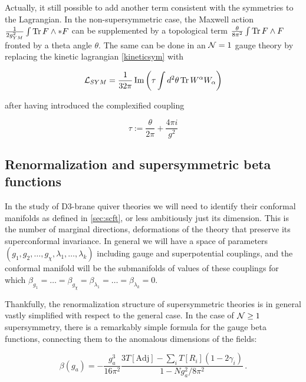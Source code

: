 Actually, it still possible to add another term consistent with the symmetries to the Lagrangian. In the non-supersymmetric case, the Maxwell action $\frac{1}{2g_{YM}^2} \int \operatorname{Tr} F \wedge \ast F$ can be supplemented by a topological term $\frac{\theta}{8\pi^2} \int \operatorname{Tr} F \wedge F$ fronted by a theta angle $\theta$. The same can be done in an $\mathcal{N} = 1$ gauge theory by replacing the kinetic lagrangian \eqref{kineticsym} with

\begin{equation}
	\mathcal{L}_{SYM} = \frac{1}{32\pi} \operatorname{Im} \left( \tau \int d^2 \theta \operatorname{Tr} W^\alpha W_\alpha \right)
	\label{kineticsymtau}
\end{equation}

after having introduced the complexified coupling

\begin{equation}
	\tau := \frac{\theta}{2\pi} + \frac{4\pi i}{g^2}
	\label{complexcoupling}
\end{equation}

\subsection{Renormalization and supersymmetric beta functions}

In the study of D3-brane quiver theories we will need to identify their conformal manifolds as defined in \ref{sec:scft}, or less ambitiously just its dimension. This is the number of marginal directions, deformations of the theory that preserve its superconformal invariance. In general we will have a space of parameters $(g_1, g_2, \ldots, g_\chi, \lambda_1, \ldots, \lambda_k)$ including gauge and superpotential couplings, and the conformal manifold will be the submanifolds of values of these couplings for which $\beta_{g_1} = \ldots = \beta_{g_\chi} = \beta_{\lambda_1} = \ldots = \beta_{\lambda_k} = 0$.

Thankfully, the renormalization structure of supersymmetric theories is in general vastly simplified with respect to the general case. In the case of $\mathcal{N} \geq 1$ supersymmetry, there is a remarkably simple formula for the gauge beta functions, connecting them to the anomalous dimensions of the fields:

\begin{equation}
	\beta(g_a) = - \frac{g_a^3}{16\pi^2} \frac{3 T[\mathrm{Adj}] - \sum_i T[R_i] (1- 2\gamma_i) }{1-Ng_a^2 / 8\pi^2 }\,.
	\label{NSVZ}
\end{equation}

